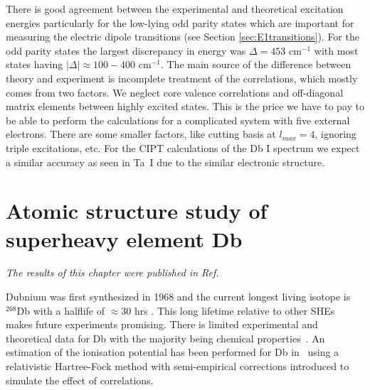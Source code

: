 \documentclass[10pt,a4paper, twoside]{report}
\begin{document}
There is good agreement between the experimental and theoretical excitation energies particularly for the low-lying odd parity 
states which are important for measuring the electric dipole transitions (see Section \ref{sec:E1transitions}). For the odd parity
states the largest discrepancy in energy was $\Delta = 453$ cm$^{-1}$ with most states having $|\Delta| \approx 100-400$ 
cm$^{-1}$. The main source of the difference between theory and experiment is incomplete treatment of the correlations,
which mostly comes from two factors. We neglect core valence correlations and off-diagonal matrix elements between
highly excited states. This is the price we have to pay to be able to perform the calculations for a
complicated system with five external electrons. There are some smaller factors, like cutting basis at $l_{max}=4$, 
ignoring triple excitations, etc.
For the CIPT calculations of the Db I spectrum we expect a similar accuracy as seen in Ta~I due to the similar electronic structure.\\

\chapter{Atomic structure study of superheavy element Db } \label{chap:Db}
\textit{The results of this chapter were published in Ref. \cite{LDFDb2018}}

Dubnium was first synthesized in 1968 and the current longest living isotope is $^{268}$Db with a halflife of $\approx 30 $ hrs 
\cite{Schadel2012, Oganessian2005}. This long lifetime relative to other SHEs makes future experiments promising. 
There is limited experimental and theoretical data for Db with the majority being chemical properties~\cite{Schadel2012,
 Fricke1975}.  An estimation of the ionisation potential has been performed for Db in~\cite{Dzuba2016} using a relativistic 
 Hartree-Fock  method with semi-empirical corrections introduced to simulate the effect of correlations.
\end{document}
